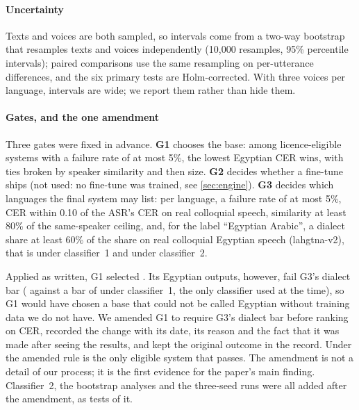 \begin{table}[t]
\centering\small
\caption{Metrics on calibration speech. The dialect classifiers separate colloquial Egyptian (lahgtna-v2) from read
Egyptian FLEURS, which is mostly MSA in register. NileTTS is synthetic colloquial speech from a commercial generator,
shown for comparison only: both classifiers label it Egyptian, so they do not reject synthetic speech as such.}
\label{tab:calibration}
\end{table}

\paragraph{Uncertainty}
Texts and voices are both sampled, so intervals come from a two-way bootstrap that resamples texts and voices
independently (10,000 resamples, 95\% percentile intervals); paired comparisons use the same resampling on
per-utterance differences, and the six primary tests are Holm-corrected. With three voices per language, intervals
are wide; we report them rather than hide them.

\paragraph{Gates, and the one amendment}
Three gates were fixed in advance. \textbf{G1} chooses the base: among licence-eligible systems with a failure
rate of at most 5\%, the lowest Egyptian CER wins, with ties broken by speaker similarity and then size.
\textbf{G2} decides whether a fine-tune ships (not used: no fine-tune was trained, see \cref{sec:engine}).
\textbf{G3} decides which languages the final system may list: per language, a failure rate of at most 5\%, CER
within 0.10 of the ASR's CER on real colloquial speech, similarity at least 80\% of the same-speaker ceiling, and,
for the label ``Egyptian Arabic'', a dialect share at least 60\% of the share on real colloquial Egyptian speech
(lahgtna-v2), that is  under classifier~1 and  under classifier~2.

Applied as written, G1 selected \cbthree. Its Egyptian outputs, however, fail G3's dialect bar
( against a bar of  under classifier~1, the only classifier used at the time), so G1 would
have chosen a base that could not be called Egyptian without training data we do not have. We amended G1 to require G3's dialect bar before ranking on CER, recorded the
change with its date, its reason and the fact that it was made after seeing the results, and kept the original
outcome in the record. Under the amended rule \vox is the only eligible system that passes. The amendment is not a
detail of our process; it is the first evidence for the paper's main finding. Classifier~2, the bootstrap analyses
and the three-seed runs were all added after the amendment, as tests of it.
